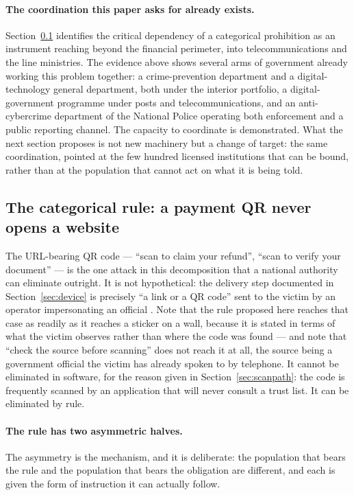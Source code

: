 \documentclass[10pt,a4paper,twocolumn]{article}
\begin{document}
\paragraph{The coordination this paper asks for already exists.}
Section~\ref{sec:categorical} identifies the critical dependency of a
categorical prohibition as an instrument reaching beyond the financial
perimeter, into telecommunications and the line ministries. The evidence above
shows several arms of government already working this problem together: a
crime-prevention department and a digital-technology general department, both
under the interior portfolio, a digital-government programme under posts and
telecommunications, and an anti-cybercrime department of the National Police
operating both enforcement and a public reporting channel.
The capacity to coordinate is demonstrated. What the next section proposes is
not new machinery but a change of target: the same coordination, pointed at the
few hundred licensed institutions that can be bound, rather than at the
population that cannot act on what it is being told.

\subsection{The categorical rule: a payment QR never opens a website}
\label{sec:categorical}

The URL-bearing QR code --- ``scan to claim your refund'', ``scan to verify your
document'' --- is the one attack in this decomposition that a national authority
can eliminate outright. It is not hypothetical: the delivery step documented in
Section~\ref{sec:device} is precisely ``a link or a QR code'' sent to the victim
by an operator impersonating an official \citep{infoblox2026cambodia}. Note that
the rule proposed here reaches that case as readily as it reaches a sticker on a
wall, because it is stated in terms of what the victim observes rather than
where the code was found --- and note that ``check the source before scanning''
does not reach it at all, the source being a government official the victim has
already spoken to by telephone. It cannot be eliminated in software, for the reason
given in Section~\ref{sec:scanpath}: the code is frequently scanned by an
application that will never consult a trust list. It can be eliminated by rule.

\paragraph{The rule has two asymmetric halves.}
The asymmetry is the mechanism, and it is deliberate: the population that bears
the rule and the population that bears the obligation are different, and each is
given the form of instruction it can actually follow.
\end{document}

